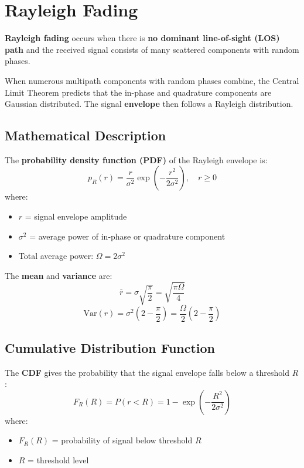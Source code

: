 \section{Rayleigh Fading}

\textbf{Rayleigh fading} occurs when there is \textbf{no dominant line-of-sight (LOS) path} and the received signal consists of many scattered components with random phases.

\begin{keyconcept}
When numerous multipath components with random phases combine, the Central Limit Theorem predicts that the in-phase and quadrature components are Gaussian distributed. The signal \textbf{envelope} then follows a Rayleigh distribution.
\end{keyconcept}

\subsection{Mathematical Description}

The \textbf{probability density function (PDF)} of the Rayleigh envelope is:
\begin{equation}
p_R(r) = \frac{r}{\sigma^2} \exp\left(-\frac{r^2}{2\sigma^2}\right), \quad r \geq 0
\end{equation}
where:
\begin{itemize}
\item $r$ = signal envelope amplitude
\item $\sigma^2$ = average power of in-phase or quadrature component
\item Total average power: $\Omega = 2\sigma^2$
\end{itemize}

The \textbf{mean} and \textbf{variance} are:
\begin{equation}
\bar{r} = \sigma\sqrt{\frac{\pi}{2}} = \sqrt{\frac{\pi \Omega}{4}}
\end{equation}
\begin{equation}
\text{Var}(r) = \sigma^2\left(2 - \frac{\pi}{2}\right) = \frac{\Omega}{2}\left(2 - \frac{\pi}{2}\right)
\end{equation}

\subsection{Cumulative Distribution Function}

The \textbf{CDF} gives the probability that the signal envelope falls below a threshold $R$:
\begin{equation}
F_R(R) = P(r < R) = 1 - \exp\left(-\frac{R^2}{2\sigma^2}\right)
\end{equation}
where:
\begin{itemize}
\item $F_R(R)$ = probability of signal below threshold $R$
\item $R$ = threshold level
\end{itemize}

